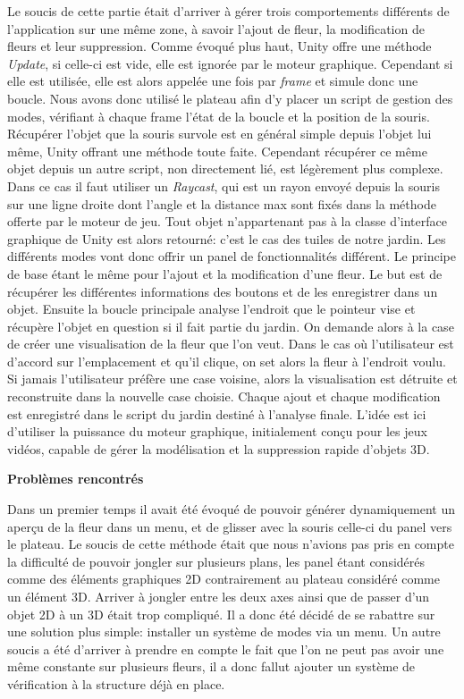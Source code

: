Le soucis de cette partie était d'arriver à gérer trois comportements différents de l'application sur une même zone, à savoir l'ajout de fleur, la modification de fleurs et leur suppression.
Comme évoqué plus haut, Unity offre une méthode \textit{Update}, si celle-ci est vide, elle est ignorée par le moteur graphique. Cependant si elle est utilisée, elle est alors appelée une fois par \textit{frame} et simule donc une boucle.
Nous avons donc utilisé le plateau afin d'y placer un script de gestion des modes, vérifiant à chaque frame l'état de la boucle et la position de la souris.
Récupérer l'objet que la souris survole est en général simple depuis l'objet lui même, Unity offrant une méthode toute faite. Cependant récupérer ce même objet depuis un autre script, non directement lié, est légèrement plus complexe. Dans ce cas il faut utiliser un \textit{Raycast}, qui est un rayon envoyé depuis la souris sur une ligne droite dont l'angle et la distance max sont fixés dans la méthode offerte par le moteur de jeu. Tout objet n'appartenant pas à la classe d'interface graphique de Unity est alors retourné: c'est le cas des tuiles de notre jardin.
\newline
Les différents modes vont donc offrir un panel de fonctionnalités différent. Le principe de base étant le même pour l'ajout et la modification d'une fleur. Le but est de récupérer les différentes informations des boutons et de les enregistrer dans un objet. Ensuite la boucle principale analyse l'endroit que le pointeur vise et récupère l'objet en question si il fait partie du jardin. On demande alors à la case de créer une visualisation de la fleur que l'on veut. Dans le cas où l'utilisateur est d'accord sur l'emplacement et qu'il clique, on set alors la fleur à l'endroit voulu. Si jamais l'utilisateur préfère une case voisine, alors la visualisation est détruite et reconstruite dans la nouvelle case choisie.
\newline
Chaque ajout et chaque modification est enregistré dans le script du jardin destiné à l'analyse finale.
\newline
L'idée est ici d'utiliser la puissance du moteur graphique, initialement conçu pour les jeux vidéos, capable de gérer la modélisation et la suppression rapide d'objets 3D.
\begin{center}\textbf{Problèmes rencontrés}\end{center}
Dans un premier temps il avait été évoqué de pouvoir générer dynamiquement un aperçu de la fleur dans un menu, et de glisser avec la souris celle-ci du panel vers le plateau. Le soucis de cette méthode était que nous n'avions pas pris en compte la difficulté de pouvoir jongler sur plusieurs plans, les panel étant considérés comme des éléments graphiques 2D contrairement au plateau considéré comme un élément 3D. Arriver à jongler entre les deux axes ainsi que de passer d'un objet 2D à un 3D était trop compliqué.
Il a donc été décidé de se rabattre sur une solution plus simple: installer un système de modes via un menu.
Un autre soucis a été d'arriver à prendre en compte le fait que l'on ne peut pas avoir une même constante sur plusieurs fleurs, il a donc fallut ajouter un système de vérification à la structure déjà en place.

